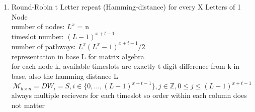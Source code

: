 \documentclass{article}
\begin{document}
\begin{enumerate}
            Example 2.2 (3 letters, x = 2):
            number of nodes: $3^{2}$ = 9
            timeslot number: $2^{2} = 4$
            number of pathways: $3^{2} \times 2^{2}/2 = 18$
            W = Adjacency Matrix of a Directed Graph, where each timeslot is the
            row and each column is the node
            \[
                A =
                \begin{bmatrix}
                    1 & 0 & 0 & 0 & 1 & 2 & 0 & 1 & 2 \\
                    2 & 2 & 1 & 4 & 3 & 3 & 3 & 4 & 5 \\
                    3 & 4 & 5 & 5 & 5 & 4 & 7 & 6 & 6 \\
                    6 & 7 & 8 & 6 & 7 & 8 & 8 & 8 & 7 \\
                \end{bmatrix}
            \]
            \[
                W_{8 \times 8}= \mathscr{M}\mid W_{A_{i,k},i}= 1, \neg(W_{A_{i,k},i}
                ) = 0
            \]
            \[
                \mathscr{M}_{b \times n}= DW = S, i \in \{1, ... ,n-1\}
            \]

        \item Round-Robin t Letter repeat (Hamming-distance) for every X Letters
            of 1 Node\\
            number of nodes: $L^{x}$ = n \\
            timeslot number: $(L-1)^{x+t-1}$ \\
            number of pathways: $L^{x}(L^{x}-1)^{x+t-1}/2$ \\
            representation in base L for matrix algebra\\
            for each node k, available timeslots are exactly t digit difference from
            k in base, also the hamming distance L\\
            \[
                \mathscr{M}_{b \times n}= DW_{i}= S, i \in \{0, ... ,(L-1)^{x+t-1}
                \}, j \in \mathbb{Z}, 0\leq j \leq (L-1)^{x+t-1}
            \]
            always multiple recievers for each timeslot so order within each column
            does not matter


\end{enumerate}
\end{document}
